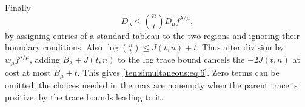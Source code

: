 Finally
\[
 D_\lambda\le \binom nt D_\mu f^{\lambda/\mu},
\]
by assigning entries of a standard tableau to the two regions and ignoring their boundary conditions. Also \(\log\binom nt\le J(t,n)+t\). Thus after division by \(w_\mu f^{\lambda/\mu}\), adding \(B_\lambda+J(t,n)\) to the log trace bound cancels the \(-2J(t,n)\) at cost at most \(B_\mu+t\). This gives \eqref{ten:simultaneous:eq:6}. Zero terms can be omitted; the choices needed in the max are nonempty when the parent trace is positive, by the trace bounds leading to it.
